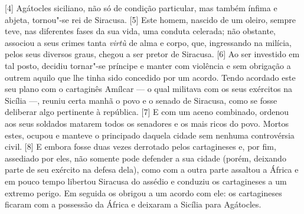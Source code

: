 {[}4{]} Agátocles
siciliano, não só de condição particular, mas também ínfima e
abjeta, tornou"-se rei de Siracusa. {[}5{]} Este homem, nascido de um
oleiro, sempre teve, nas diferentes fases da sua vida, uma conduta
celerada; não obstante, associou a seus crimes tanta \emph{virtù} de
alma e corpo, que, ingressando na milícia, pelos seus diversos graus, chegou a ser pretor de Siracusa. {[}6{]} Ao ser
investido em tal posto, decidiu tornar"-se príncipe e manter com
violência e sem obrigação a outrem aquilo que lhe tinha sido concedido
por um acordo. Tendo acordado este seu plano com o cartaginês
Amílcar --- o qual militava com os seus exércitos na Sicília ---, reuniu
certa manhã o povo e o senado de Siracusa, como se fosse deliberar algo
pertinente à república. {[}7{]} E com um aceno combinado, ordenou aos
seus soldados matarem todos os senadores e os mais ricos do povo. Mortos
estes, ocupou e manteve o principado daquela cidade sem nenhuma
controvérsia civil. {[}8{]} E embora fosse duas vezes derrotado pelos
cartagineses e, por fim, assediado por eles, não somente pode defender a
sua cidade (porém, deixando parte de seu exército na defesa dela), como
com a outra parte assaltou a África e em pouco tempo libertou Siracusa
do assédio e conduziu os cartagineses a um extremo perigo. Em seguida os
obrigou a um acordo com ele: os cartagineses ficaram com a possessão da
África e deixaram a Sicília para Agátocles.


